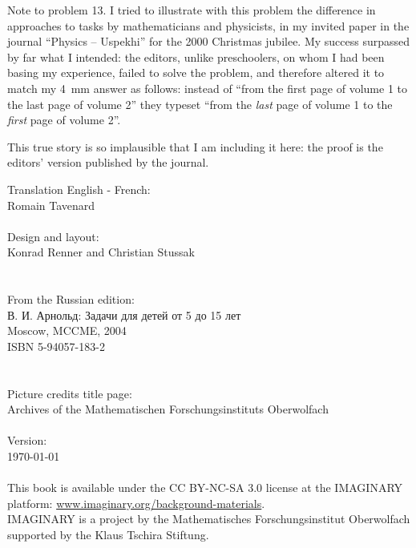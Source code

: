 \vfill
\begin{note}{Note to problem 13.}
	I tried to illustrate with this problem the difference in approaches to tasks by mathematicians and physicists, in my invited paper in the journal \enquote{Physics -- Uspekhi} for the 2000 Christmas jubilee. My success surpassed by far what I intended: the editors, unlike preschoolers, on whom I had been basing my experience, failed to solve the problem, and therefore altered it to match my \SI{4}{\mm} answer as follows: instead of \enquote{from the first page of volume 1 to the last page of volume 2} they typeset \enquote{from the \emph{last} page of volume 1 to the \emph{first} page of volume 2}.

	This true story is so implausible that I am including it here: the proof is the editors' version published by the journal.
\end{note}
\clearpage
\null\vfill
\noindent
Translation English - French:\\
\null\quad Romain Tavenard\\
\\
Design and layout:\\
\null\quad Konrad Renner and Christian Stussak\\
\\
\\
From the Russian edition:\\
\null\quad \textrussian{В. И. Арнольд: Задачи для детей от 5 до 15 лет}\\
\null\quad Moscow, MCCME, 2004\\
\null\quad ISBN 5-94057-183-2\\
\\
\\
Picture credits title page:\\
\null\quad Archives of the Mathematischen Forschungsinstituts Oberwolfach\\
\\
Version:\\
\null\quad \today\\
\\
This book is available under the CC BY-NC-SA 3.0 license at the IMAG\-I\-NARY platform: \href{http://www.imaginary.org/background-materials}{www.imaginary.org/background-materials}.\\
IMAGINARY is a project by the Mathematisches Forschungsinstitut Oberwolfach supported by the Klaus Tschira Stiftung.

